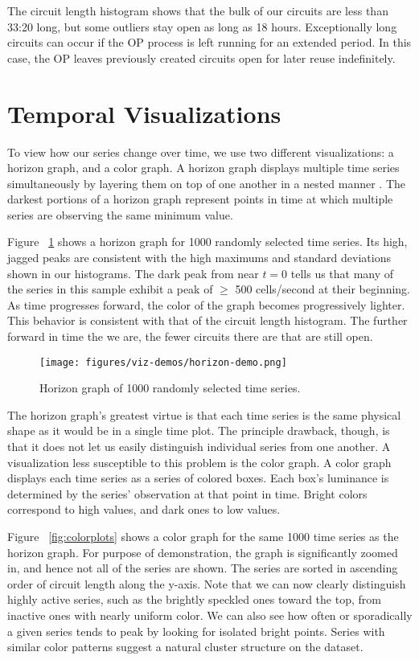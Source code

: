 The circuit length histogram shows that the bulk of our circuits are less than 33:20 long, but some outliers stay open as long as 18 hours. Exceptionally long circuits can occur if the OP process is left running for an extended period. In this case, the OP leaves previously created circuits open for later reuse indefinitely.

\section{Temporal Visualizations}
To view how our series change over time, we use two different visualizations: a horizon graph, and a color graph. A horizon graph displays multiple time series simultaneously by layering them on top of one another in a nested manner \citep{heer2009}. The darkest portions of a horizon graph represent points in time at which multiple series are observing the same minimum value.

Figure ~\ref{fig:horizon} shows a horizon graph for 1000 randomly selected time series. Its high, jagged peaks are consistent with the high maximums and standard deviations shown in our histograms. The dark peak from near $t=0$ tells us that many of the series in this sample exhibit a peak of $\geq$ 500 cells/second at their beginning. As time progresses forward, the color of the graph becomes progressively lighter. This behavior is consistent with that of the circuit length histogram. The further forward in time the we are, the fewer circuits there are that are still open.

\begin{figure}
	\centerline{\texttt{[image: figures/viz-demos/horizon-demo.png]}}
	\caption{Horizon graph of 1000 randomly selected time series.}
	\label{fig:horizon}
\end{figure}

The horizon graph's greatest virtue is that each time series is the same physical shape as it would be in a single time plot. The principle drawback, though, is that it does not let us easily distinguish individual series from one another. A visualization less susceptible to this problem is the color graph. A color graph displays each time series as a series of colored boxes. Each box's luminance is determined by the series' observation at that point in time. Bright colors correspond to high values, and dark ones to low values.

Figure ~\ref{fig:colorplots} shows a color graph for the same 1000 time series as the horizon graph. For purpose of demonstration, the graph is significantly zoomed in, and hence not all of the series are shown. The series are sorted in ascending order of circuit length along the y-axis. Note that we can now clearly distinguish highly active series, such as the brightly speckled ones toward the top, from inactive ones with nearly uniform color. We can also see how often or sporadically a given series tends to peak by looking for isolated bright points. Series with similar color patterns suggest a natural cluster structure on the dataset.

